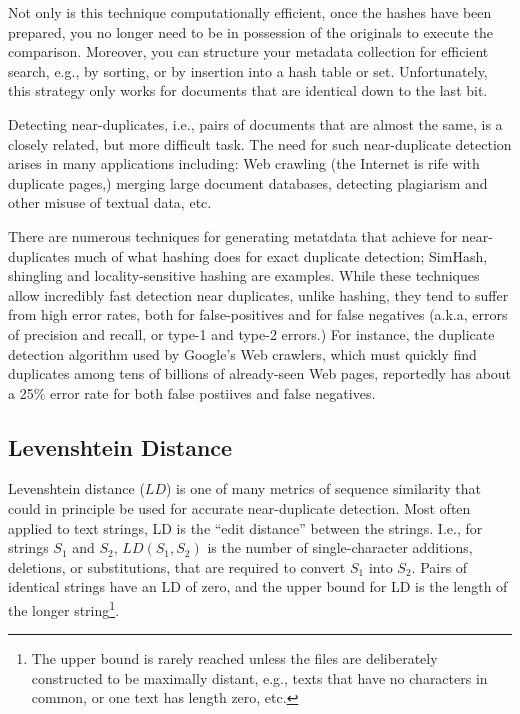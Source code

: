 \documentclass[html]{article}    %
\begin{document}
Not only is this technique computationally efficient, once the hashes have been 
prepared, you no longer need to be in possession of the originals to execute 
the comparison.
Moreover, you can structure your metadata collection for efficient search, e.g.,
by sorting, or by insertion into a hash table or set.
Unfortunately, this strategy only works for documents that are identical down to
the last bit.

Detecting near-duplicates, i.e., pairs of documents that are almost the same, is
a closely related, but more difficult task. 
The need for such near-duplicate detection arises in many applications including:
Web crawling (the Internet is rife with duplicate pages,) merging large 
document databases, detecting plagiarism and other misuse of textual data, etc.

There are numerous techniques for generating metatdata that
achieve for near-duplicates much of what hashing does for exact 
duplicate detection; SimHash, shingling and locality-sensitive hashing are examples.
While these techniques allow incredibly fast detection near duplicates, unlike
hashing, they tend to suffer from high error rates, both for false-positives and
for false negatives (a.k.a, errors of precision and recall, or type-1 and type-2 errors.)
For instance, the duplicate detection algorithm used by Google's Web crawlers,
which must quickly find duplicates among tens of billions of already-seen Web
pages, reportedly has about a 25\% error rate for both false postiives and false
negatives.

\subsection{Levenshtein Distance}

Levenshtein distance ($LD$) is one of many metrics of sequence similarity
that could in principle be used for accurate near-duplicate detection.
Most often applied to text strings, LD is the ``edit distance'' between the
strings.  
I.e., for strings  $S_{1}$ and $S_{2}$,  $LD(S_{1},S_{2})$ is the number of 
single-character additions, deletions, or substitutions, that are required to
convert $S_{1}$ into $S_{2}$. 
Pairs of identical strings have an LD of zero, and the upper bound for LD is 
the length of the longer string\footnote{
	The upper bound is rarely reached unless the files are deliberately constructed
	to be maximally distant, e.g., texts that have no characters in common, or one
	text has length zero, etc.
}.
\end{document}
